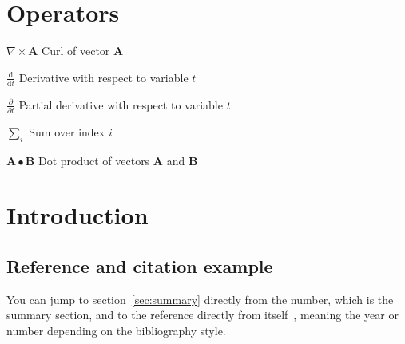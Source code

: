 \documentclass[12pt, a4paper, oneside]{article}
\begin{document}
\section*{Operators}

\begin{abbreviations}[style=multiline,leftmargin=3cm,font=\normalfont,itemsep=0pt,parsep=0.6\baselineskip,labelindent=5mm]
    \item [$\nabla \times \mathbf{A}$]                    Curl of vector $\mathbf{A}$
    \item [$\displaystyle\frac{\mbox{d}}{\mbox{d} t}$]    Derivative with respect to variable $t$
    \item [$\displaystyle\frac{\partial}{\partial t}$]    Partial derivative with respect to variable $t$
    \item [$\sum_i $]                                     Sum over index $i$
    \item [$\mathbf{A} \bullet \mathbf{B}$]               Dot product of vectors $\mathbf{A}$ and $\mathbf{B}$
\end{abbreviations}

\cleardoublepage


\setcounter{page}{1}
\onehalfspacing

\section{Introduction} \label{sec:intro}


\blindtext
\blinditemize
\blindtext

\subsection{Reference and citation example} \label{subsec:reference-and-citation-example}

You can jump to section~\ref{sec:summary} directly from the number, which is the summary section,
and to the reference directly from itself~\citep{vet2007ophthal},
meaning the year or number depending on the bibliography style.

\end{document}
